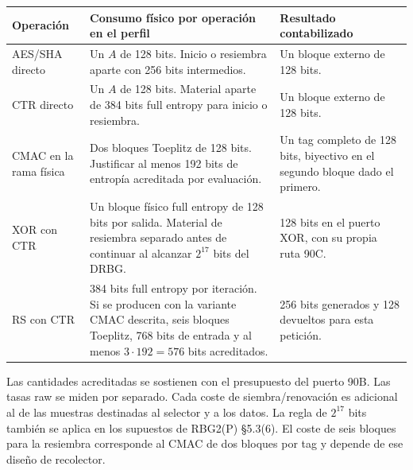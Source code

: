 \begin{center}
\small
\begin{tabularx}{\linewidth}{@{}lYY@{}}
\toprule
Operación & Consumo físico por operación en el perfil & Resultado contabilizado \\
\midrule
AES/SHA directo & Un $A$ de 128 bits. Inicio o resiembra aparte con 256 bits intermedios. & Un bloque externo de 128 bits. \\
CTR directo & Un $A$ de 128 bits. Material aparte de 384 bits full entropy para inicio o resiembra. & Un bloque externo de 128 bits. \\
CMAC en la rama física & Dos bloques Toeplitz de 128 bits. Justificar al menos 192 bits de entropía acreditada por evaluación. & Un tag completo de 128 bits, biyectivo en el segundo bloque dado el primero. \\
XOR con CTR & Un bloque físico full entropy de 128 bits por salida. Material de resiembra separado antes de continuar al alcanzar $2^{17}$ bits del DRBG. & 128 bits en el puerto XOR, con su propia ruta 90C. \\
RS con CTR & 384 bits full entropy por iteración. Si se producen con la variante CMAC descrita, seis bloques Toeplitz, 768 bits de entrada y al menos $3\cdot192=576$ bits acreditados. & 256 bits generados y 128 devueltos para esta petición. \\
\bottomrule
\end{tabularx}
\end{center}
Las cantidades acreditadas se sostienen con el presupuesto del puerto
90B. Las tasas raw se miden por separado. Cada coste de siembra/renovación es
adicional al de las muestras destinadas al selector y a los datos.
La regla de $2^{17}$ bits también se aplica en los supuestos de RBG2(P)
§5.3(6). El coste de seis bloques para la resiembra corresponde al CMAC
de dos bloques por tag y depende de ese diseño de recolector.

